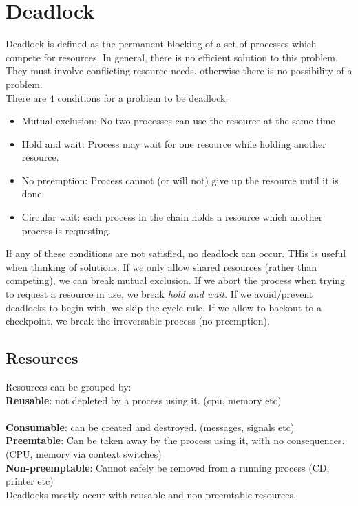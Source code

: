 \documentclass[12pt]{article}
\theoremstyle{definition}
\begin{document}
\section{Deadlock}
Deadlock is defined as the permanent blocking of a set of processes which compete for resources. In general, there is no efficient solution to this problem. They must involve conflicting resource needs, otherwise there is no possibility of a problem.
\\ \linebreak
There are 4 conditions for a problem to be deadlock:
\begin{itemize}
	\item Mutual exclusion: No two processes can use the resource at the same time
	\item Hold and wait: Process may wait for one resource while holding another resource.
	\item No preemption: Process cannot (or will not) give up the resource until it is done.
	\item Circular wait: each process in the chain holds a resource which another process is requesting.
\end{itemize}
If any of these conditions are not satisfied, no deadlock can occur. THis is useful when thinking of solutions. If we only allow shared resources (rather than competing), we can break mutual exclusion. If we abort the process when trying to request a resource in use, we break \textit{hold and wait}. If we avoid/prevent deadlocks to begin with, we skip the cycle rule. If we allow to backout to a checkpoint, we break the irreversable process (no-preemption).
\\ \linebreak

\subsection{Resources}
Resources can be grouped by:
\\ \linebreak
\textbf{Reusable}: not depleted by a process using it. (cpu, memory etc)
\\ \linebreak
\\ \textbf{Consumable}: can be created and destroyed. (messages, signals etc)
\\ \linebreak
\textbf{Preemtable}: Can be taken away by the process using it, with no consequences. (CPU, memory via context switches)
\\ \linebreak
\textbf{Non-preemptable}: Cannot safely be removed from a running process (CD, printer etc)
\\ \linebreak
Deadlocks mostly occur with reusable and non-preemtable resources.
\end{document}
